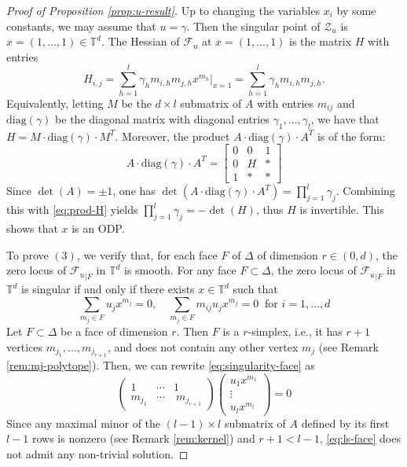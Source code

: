 \documentclass[10pt,a4paper]{amsart}
\newcommand{\TT}{\mathbb{T}}
\begin{document}
\begin{proof}[Proof of Proposition \ref{prop:u-result}]
Up to changing the variables $x_i$ by some constants, we may assume that $u=\gamma$. Then the singular point of $\mathcal{Z}_u$ is $x=(1, \dots, 1) \in \TT^d$. The Hessian of $\mathcal{F}_u$ at $x=(1, \dots, 1)$ is the matrix $H$ with entries 
\begin{equation}\label{eq:hessian}
H_{i,j}= \sum_{h=1}^l \gamma_h m_{i,h} m_{j,h}  x^{m_h}\bigg|_{x=1} = \sum_{h=1}^l \gamma_h m_{i,h} m_{j,h}.
\end{equation}
Equivalently, letting $M$ be the $d \times l$ submatrix of ${A}$ with entries $m_{ij}$ and $\mathrm{diag}(\gamma)$  be the diagonal matrix with diagonal entries $\gamma_1, \dots, \gamma_l$, we have that $H=M \cdot \mathrm{diag}(\gamma) \cdot M^T$.
Moreover, 
the product ${A} \cdot \mathrm{diag}(\gamma)  \cdot {A}^T$ is of the form: 
\begin{equation}
\label{eq:prod-H}
{A} \cdot \mathrm{diag}(\gamma)  \cdot {A}^T =\begin{bmatrix}
0 & 0 & 1 \\
0 & H & * \\
1 & * & *
\end{bmatrix} 
\end{equation}
Since $\det({A})=\pm 1$, one has $\det({A} \cdot \mathrm{diag}(\gamma)  \cdot {A}^T)=\prod_{j=1}^l \gamma_j$. Combining this with \eqref{eq:prod-H} yields  $\prod_{j=1}^l \gamma_j=-\det(H)$,  thus $H$ is invertible. This shows that $x$ is an ODP.

To prove $(3)$, we verify that, for each face $F$ of $\Delta$ of dimension $r \in (0,d)$, the zero locus of ${\mathcal{F}_u}_{|F}$ in $\TT^d$ is smooth. 
For any face $F\subset \Delta$, the zero locus of ${\mathcal{F}_u}_{|F}$ in $\TT^d$ is singular if and only if there exists $x \in \TT^d$ such that 
\begin{equation}
\label{eq:singularity-face}
   \sum_{m_j \in F } u_j x^{m_{j}}=0, \quad  
    \sum_{m_j \in F }   m_{ij} u_j x^{m_j}=0  \ \text{ for } i=1,\dots,d
\end{equation}
Let $F\subset \Delta$ be a face of dimension $r$. Then $F$ is a $r$-simplex, i.e., it has $r+1$ vertices $m_{j_1}, \dots, m_{j_{r+1}}$, and does not contain any other vertex $m_j$ (see Remark \ref{rem:mj-polytope}). 
Then, we can rewrite  
\eqref{eq:singularity-face} as 
\begin{equation}
\label{eq:ls-face}
\begin{pmatrix}
1 & \cdots  & 1\\
m_{j_1} & \cdots & \ m_{j_{r+1}}
\end{pmatrix}\begin{pmatrix}
u_1 x^{m_1}\\
\vdots\\
u_l x^{m_l}
\end{pmatrix} = 0
\end{equation}
Since any maximal minor of the $(l-1)\times l$ submatrix of ${A}$ defined by its first $l-1$ rows is nonzero (see Remark \ref{rem:kernel}) and $r+1<l-1$,  \eqref{eq:ls-face} does not admit any non-trivial solution.  


\end{proof}
\end{document}
